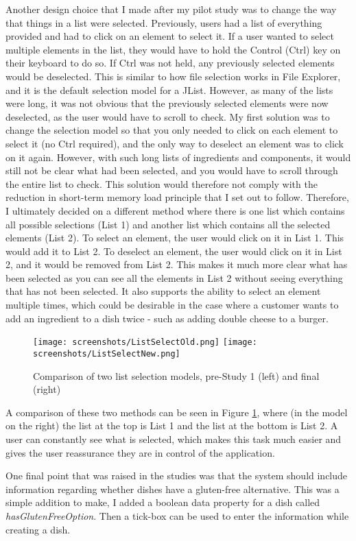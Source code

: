 Another design choice that I made after my pilot study was to change the way that things in a list were selected. Previously, users had a list of everything provided and had to click on an element to select it. If a user wanted to select multiple elements in the list, they would have to hold the Control (Ctrl) key on their keyboard to do so. If Ctrl was not held, any previously selected elements would be deselected. This is similar to how file selection works in File Explorer, and it is the default selection model for a JList. However, as many of the lists were long, it was not obvious that the previously selected elements were now deselected, as the user would have to scroll to check. My first solution was to change the selection model so that you only needed to click on each element to select it (no Ctrl required), and the only way to deselect an element was to click on it again. However, with such long lists of ingredients and components, it would still not be clear what had been selected, and you would have to scroll through the entire list to check. This solution would therefore not comply with the reduction in short-term memory load principle that I set out to follow. Therefore, I ultimately decided on a different method where there is one list which contains all possible selections (List 1) and another list which contains all the selected elements (List 2). To select an element, the user would click on it in List 1. This would add it to List 2. To deselect an element, the user would click on it in List 2, and it would be removed from List 2. This makes it much more clear what has been selected as you can see all the elements in List 2 without seeing everything that has not been selected. It also supports the ability to select an element multiple times, which could be desirable in the case where a customer wants to add an ingredient to a dish twice - such as adding double cheese to a burger. 

\begin{figure}[h]
    \centering
    \captionsetup{justification=centering}
    \texttt{[image: screenshots/ListSelectOld.png]}
    \texttt{[image: screenshots/ListSelectNew.png]}
    \caption[Comparison of two list selection models]{Comparison of two list selection models, pre-Study 1 (left) and final (right)}
    \label{fig:list_selection_comparison}
\end{figure}

A comparison of these two methods can be seen in Figure \ref{fig:list_selection_comparison}, where (in the model on the right) the list at the top is List 1 and the list at the bottom is List 2. A user can constantly see what is selected, which makes this task much easier and gives the user reassurance they are in control of the application.

One final point that was raised in the studies was that the system should include information regarding whether dishes have a gluten-free alternative. This was a simple addition to make, I added a boolean data property for a dish called \textit{hasGlutenFreeOption}. Then a tick-box can be used to enter the information while creating a dish.

